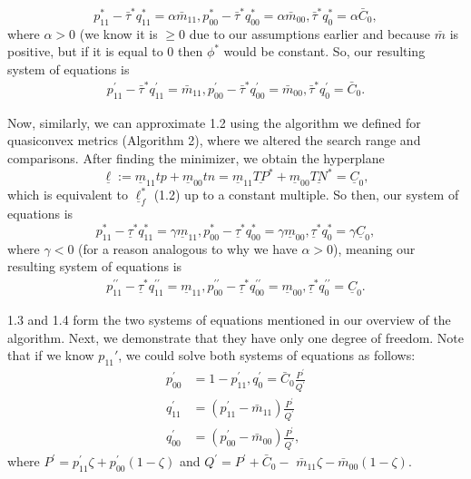 \documentclass[
  letterpaper,
  numbers=noenddot,
  DIV=11,
  oneside]{scrreprt}
\theoremstyle{remark}
\begin{document}
\[p_{11}^{*}-\bar{\tau}^{*} q_{11}^{*}=\alpha \bar{m}_{11}, p_{00}^{*}-\bar{\tau}^{*} q_{00}^{*}=\alpha \bar{m}_{00}, \bar{\tau}^{*} q_{0}^{*}=\alpha \bar{C}_{0},\]
where \(\alpha > 0\) (we know it is \(\geq0\) due to our assumptions
earlier and because \(\bar{m}\) is positive, but if it is equal to \(0\)
then \(\phi^*\) would be constant. So, our resulting system of equations
is \[\begin{aligned}
    p_{11}^{\prime}-\bar{\tau}^{*} q_{11}^{\prime}=\bar{m}_{11}, p_{00}^{\prime}-\bar{\tau}^{*} q_{00}^{\prime}=\bar{m}_{00}, \bar{\tau}^{*} q_{0}^{\prime}=\bar{C}_{0}.
\end{aligned}\]

Now, similarly, we can approximate 1.2 using the algorithm we defined
for quasiconvex metrics (Algorithm 2), where we altered the search range
and comparisons. After finding the minimizer, we obtain the hyperplane
\[\underline{\ell}:=\underline{m}_{11} t p+\underline{m}_{00} t n=\underline{m}_{11} \underline{TP}^{*}+\underline{m}_{00} \underline{TN}^{*} = \underline{C}_{0},\]
which is equivalent to \(\underline{\ell}_{f}^{*}\) (1.2) up to a
constant multiple. So then, our system of equations is
\[p_{11}^{*}-\underline{\tau}^{*} q_{11}^{*}=\gamma \underline{m}_{11}, p_{00}^{*}-\underline{\tau}^{*} q_{00}^{*}=\gamma \underline{m}_{00}, \underline{\tau}^{*} q_{0}^{*}=\gamma \underline{C}_{0},\]
where \(\gamma <0\) (for a reason analogous to why we have
\(\alpha >0\)), meaning our resulting system of equations is
\[\begin{aligned}
    p_{11}^{\prime \prime}-\underline{\tau}^{*} q_{11}^{\prime \prime}=\underline{m}_{11}, p_{00}^{\prime \prime}-\underline{\tau}^{*} q_{00}^{\prime \prime}=\underline{m}_{00}, \underline{\tau}^{*} q_{0}^{\prime \prime}=\underline{C}_{0}.
\end{aligned}\]

1.3 and 1.4 form the two systems of equations mentioned in our overview
of the algorithm. Next, we demonstrate that they have only one degree of
freedom. Note that if we know \(p_{11}'\), we could solve both systems
of equations as follows: \[\begin{aligned}
    p_{00}^{\prime}  &=1-p_{11}^{\prime}, q_{0}^{\prime}=\bar{C}_{0} \frac{P^{\prime}}{Q^{\prime}}\\
    q_{11}^{\prime}  &=\left(p_{11}^{\prime}-\bar{m}_{11}\right) \frac{P^{\prime}}{Q^{\prime}} \\
    q_{00}^{\prime}&=\left(p_{00}^{\prime}-\bar{m}_{00}\right) \frac{P^{\prime}}{Q^{\prime}},
\end{aligned}\] where
\(P^{\prime}=p_{11}^{\prime} \zeta+p_{00}^{\prime}(1-\zeta)\) and
\(Q^{\prime}=P^{\prime}+\bar{C}_{0}-\)
\(\bar{m}_{11} \zeta-\bar{m}_{00}(1-\zeta).\)
\end{document}
